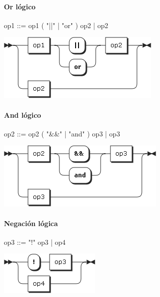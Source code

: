 \paragraph{Or lógico}
\begin{multicols}{2}
\begin{myverbatim}      
op1 ::=  op1 ( "||" | "or" ) op2
      |  op2
\end{myverbatim}  
\columnbreak	
\begin{center}
\includegraphics[scale=0.6]{diagram/lop1.png} \\
\end{center}
\end{multicols}

\paragraph{And lógico}
\begin{multicols}{2}
\begin{myverbatim}      
op2 ::=  op2 ( "&&" | "and" ) op3
      |  op3
\end{myverbatim}  
\columnbreak	
\begin{center}
\includegraphics[scale=0.6]{diagram/op2.png} \\
\end{center}
\end{multicols}

\paragraph{Negación lógica}
\begin{multicols}{2}
\begin{myverbatim}      
op3 ::=  "!" op3 
      |  op4
\end{myverbatim}  
\columnbreak	
\begin{center}
\includegraphics[scale=0.6]{diagram/op3.png} \\
\end{center}
\end{multicols}

